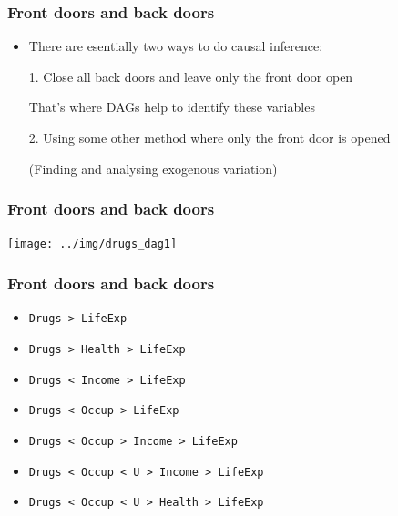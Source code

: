 \documentclass[aspectratio=43]{beamer}
\begin{document}
\begin{frame}
\frametitle{Front doors and back doors}
\centering

\begin{itemize}
  \item There are esentially two ways to do causal inference:
  \item[1.] Close all back doors and leave only the front door open
  \item[] That's where DAGs help to identify these variables
  \item[]
  \item[2.] Using some other method where only the front door is opened
  \item[] (Finding and analysing exogenous variation)
\end{itemize}

\end{frame}

\begin{frame}
\frametitle{Front doors and back doors}
\centering

\texttt{[image: ../img/drugs\_dag1]}

\end{frame}

\begin{frame}
\frametitle{Front doors and back doors}
\centering

\begin{itemize}
  \item \texttt{Drugs > LifeExp}
  \item \texttt{Drugs > Health > LifeExp}
  \item \texttt{Drugs < Income > LifeExp}
  \item \texttt{Drugs < Occup > LifeExp}
  \item \texttt{Drugs < Occup > Income > LifeExp}
  \item \texttt{Drugs < Occup < U > Income > LifeExp}
  \item \texttt{Drugs < Occup < U > Health > LifeExp}
\end{itemize}

\end{frame}
\end{document}
